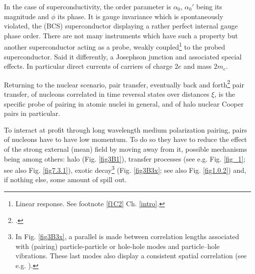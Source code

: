 In the case of superconductivity, the order parameter is $\alpha_0$, $\alpha_0'$ being its magnitude and $\phi$ its phase. It is gauge invariance which is spontaneously violated, the (BCS) superconductor displaying a rather perfect internal gauge phase order. There are not many instruments which have such a property but another superconductor acting as a probe, weakly coupled\footnote{ Linear response. See footnote \ref{f1C2} Ch. \ref{intro}.} to the probed superconductor. Said it differently, a Josephson junction and associated special effects. In particular direct currents of carriers of charge $2e$ and mass $2m_e$.


Returning to the nuclear scenario, pair transfer, eventually back and forth\footnote{\cite{Potel:20b,r}.} pair transfer, of nucleons correlated in time reversal states over distances $\xi$, is the specific probe of pairing in atomic nuclei in general, and of halo nuclear Cooper pairs in particular.

 To interact at profit through long wavelength medium polarization pairing, pairs of nucleons have to have low momentum. To do so they have to reduce the effect of the strong external (mean) field by moving away from it, possible mechanisms being among others: halo (Fig. \ref{fig3B1}), transfer processes (see e.g. Fig. \ref{fig_1}; see also Fig. \ref{fig7.3.1}), exotic decay\footnote{In Fig. \ref{fig3B3x}, a parallel is made between correlation lengths associated with (pairing) particle-particle or hole-hole modes and particle--hole vibrations. These last modes  also display a consistent spatial correlation (see e.g. \cite{Broglia:71}).} (Fig. \ref{fig3B3x}; see also Fig. \ref{fig1.0.2}) and, if nothing else, some amount of spill out.
